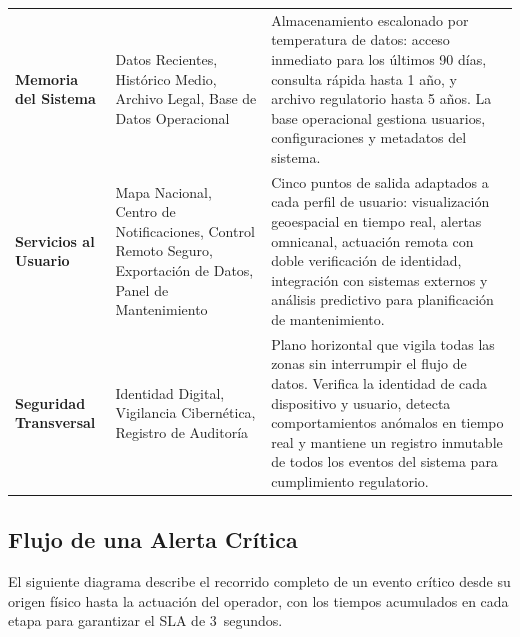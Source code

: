 \documentclass[12pt, letterpaper]{article}
\begin{document}
\begin{longtable}{
  P{2.8cm}
  P{4.2cm}
  P{6.7cm}
}
\textbf{Memoria del Sistema} &
  Datos Recientes, Histórico Medio, Archivo Legal, Base de Datos Operacional &
  Almacenamiento escalonado por temperatura de datos: acceso inmediato para los
  últimos 90 días, consulta rápida hasta 1 año, y archivo regulatorio hasta 5 años.
  La base operacional gestiona usuarios, configuraciones y metadatos del sistema. \\

\textbf{Servicios al Usuario} &
  Mapa Nacional, Centro de Notificaciones, Control Remoto Seguro,
  Exportación de Datos, Panel de Mantenimiento &
  Cinco puntos de salida adaptados a cada perfil de usuario: visualización geoespacial
  en tiempo real, alertas omnicanal, actuación remota con doble verificación de
  identidad, integración con sistemas externos y análisis predictivo para planificación
  de mantenimiento. \\

\textbf{Seguridad Transversal} &
  Identidad Digital, Vigilancia Cibernética, Registro de Auditoría &
  Plano horizontal que vigila todas las zonas sin interrumpir el flujo de datos.
  Verifica la identidad de cada dispositivo y usuario, detecta comportamientos
  anómalos en tiempo real y mantiene un registro inmutable de todos los eventos
  del sistema para cumplimiento regulatorio. \\

\end{longtable}

\subsection{Flujo de una Alerta Crítica}

El siguiente diagrama describe el recorrido completo de un evento crítico desde
su origen físico hasta la actuación del operador, con los tiempos acumulados
en cada etapa para garantizar el SLA de 3~segundos.

\vspace{6pt}
\end{document}
